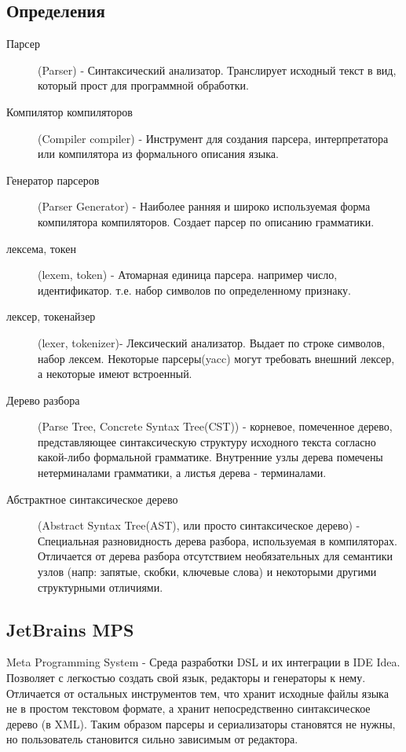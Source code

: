\documentclass[a4paper,12pt]{article}
\begin{document}
\subsection{Определения}
\begin{description}
  \item[Парсер] (Parser) -
    Синтаксический анализатор. Транслирует исходный текст в вид, который прост
    для программной обработки.
  \item[Компилятор компиляторов] (Compiler compiler) -
	Инструмент для создания парсера, интерпретатора или компилятора из формального
	описания языка.
  \item[Генератор парсеров] (Parser Generator) -
  	Наиболее ранняя и широко используемая форма компилятора компиляторов.
  	Создает парсер по описанию грамматики. 
  \item[лексема, токен] (lexem, token) - 
  	Атомарная единица парсера. например число, идентификатор. т.е. набор
  	символов по определенному признаку.
  \item[лексер, токенайзер] (lexer, tokenizer)-
  	Лексический анализатор. Выдает по строке символов, набор лексем. Некоторые
  	парсеры(yacc) могут требовать внешний лексер, а некоторые имеют встроенный.
  \item[Дерево разбора] (Parse Tree, Concrete Syntax Tree(CST)) -
  	корневое, помеченное дерево, представляющее синтаксическую структуру
  	исходного текста согласно какой-либо формальной грамматике. Внутренние узлы
  	дерева помечены нетерминалами грамматики, а листья дерева - терминалами.
  \item[Абстрактное синтаксическое дерево] (Abstract Syntax Tree(AST), или
  просто синтаксическое дерево) - Специальная разновидность дерева разбора,
  используемая в компиляторах. Отличается от дерева разбора отсутствием
  необязательных для семантики узлов (напр: запятые, скобки, ключевые слова) и
  некоторыми другими структурными отличиями.
\end{description}

\subsection{JetBrains MPS}
Meta Programming System - Среда разработки DSL и их интеграции в IDE Idea.
Позволяет с легкостью создать свой язык, редакторы и генераторы к нему.
Отличается от остальных инструментов тем, что хранит исходные файлы языка не в
простом текстовом формате, а хранит непосредственно синтаксическое дерево (в
XML). Таким образом парсеры и сериализаторы становятся не нужны, но
пользователь становится сильно зависимым от редактора.
\end{document}
